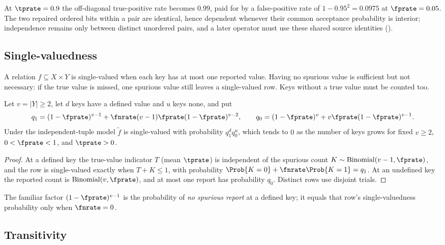 At $\tprate = 0.9$ the off-diagonal true-positive rate becomes $0.99$, paid for by
a false-positive rate of $1 - 0.95^2 = 0.0975$ at $\fprate = 0.05$. The two
repaired ordered bits within a pair are identical, hence dependent whenever their
common acceptance probability is interior; independence remains only between
distinct unordered pairs, and a later operator must use these shared source
identities ().

\subsection*{Single-valuedness}

A relation $f \subseteq X \times Y$ is single-valued when each key has at most one
reported value. Having no spurious value is sufficient but not necessary: if the
true value is missed, one spurious value still leaves a single-valued row. Keys
without a true value must be counted too.

\begin{theorem}
\label{thm:rel-functional}
Let $v = |Y| \ge 2$, let $d$ keys have a defined value and $u$ keys none, and put
\[
  q_1 = (1 - \fprate)^{v - 1} + \fnrate (v - 1) \fprate (1 - \fprate)^{v - 2},
  \qquad
  q_0 = (1 - \fprate)^{v} + v \fprate (1 - \fprate)^{v - 1}.
\]
Under the independent-tuple model $\tilde f$ is single-valued with probability
$q_1^{d} q_0^{u}$, which tends to $0$ as the number of keys grows for fixed $v \ge
2$, $0 < \fprate < 1$, and $\tprate > 0$.
\end{theorem}

\begin{proof}
At a defined key the true-value indicator $T$ (mean $\tprate$) is independent of
the spurious count $K \sim \mathrm{Binomial}(v - 1, \fprate)$, and the row is
single-valued exactly when $T + K \le 1$, with probability $\Prob{K = 0} + \fnrate
\Prob{K = 1} = q_1$. At an undefined key the reported count is
$\mathrm{Binomial}(v, \fprate)$, and at most one report has probability $q_0$.
Distinct rows use disjoint trials.
\end{proof}

The familiar factor $(1 - \fprate)^{v - 1}$ is the probability of \emph{no
spurious report} at a defined key; it equals that row's single-valuedness
probability only when $\fnrate = 0$.

\subsection*{Transitivity}


